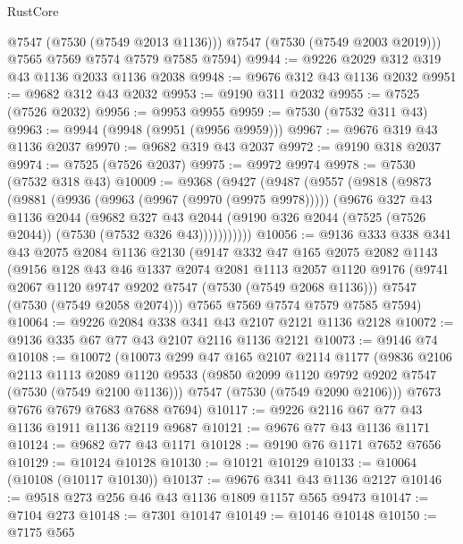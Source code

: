 \begin{lexlean}{RustCore}
\begin{coremodule}
          @7547
          (@7530 (@7549 @2013 @1136)))
        @7547
        (@7530 (@7549 @2003 @2019)))
      @7565
      @7569
      @7574
      @7579
      @7585
      @7594)
@9944 := @9226 @2029 @312 @319 @43 @1136 @2033 @1136 @2038
@9948 := @9676 @312 @43 @1136 @2032
@9951 := @9682 @312 @43 @2032
@9953 := @9190 @311 @2032
@9955 := @7525 (@7526 @2032)
@9956 := @9953 @9955
@9959 := @7530 (@7532 @311 @43)
@9963 := @9944 (@9948 (@9951 (@9956 @9959)))
@9967 := @9676 @319 @43 @1136 @2037
@9970 := @9682 @319 @43 @2037
@9972 := @9190 @318 @2037
@9974 := @7525 (@7526 @2037)
@9975 := @9972 @9974
@9978 := @7530 (@7532 @318 @43)
@10009 := @9368
    (@9427
      (@9487
        (@9557
          (@9818
            (@9873
              (@9881
                (@9936 (@9963 (@9967 (@9970 (@9975 @9978)))))
                (@9676
                  @327
                  @43
                  @1136
                  @2044
                  (@9682
                    @327
                    @43
                    @2044
                    (@9190 @326 @2044 (@7525 (@7526 @2044)) (@7530 (@7532 @326 @43)))))))))))
@10056 := @9136
    @333
    @338
    @341
    @43
    @2075
    @2084
    @1136
    @2130
    (@9147
      @332
      @47
      @165
      @2075
      @2082
      @1143
      (@9156
        @128
        @43
        @46
        @1337
        @2074
        @2081
        @1113
        @2057
        @1120
        @9176
        (@9741 @2067 @1120 @9747 @9202 @7547 (@7530 (@7549 @2068 @1136)))
        @7547
        (@7530 (@7549 @2058 @2074)))
      @7565
      @7569
      @7574
      @7579
      @7585
      @7594)
@10064 := @9226 @2084 @338 @341 @43 @2107 @2121 @1136 @2128
@10072 := @9136 @335 @67 @77 @43 @2107 @2116 @1136 @2121
@10073 := @9146 @74
@10108 := @10072
    (@10073
      @299
      @47
      @165
      @2107
      @2114
      @1177
      (@9836
        @2106
        @2113
        @1113
        @2089
        @1120
        @9533
        (@9850 @2099 @1120 @9792 @9202 @7547 (@7530 (@7549 @2100 @1136)))
        @7547
        (@7530 (@7549 @2090 @2106)))
      @7673
      @7676
      @7679
      @7683
      @7688
      @7694)
@10117 := @9226 @2116 @67 @77 @43 @1136 @1911 @1136 @2119 @9687
@10121 := @9676 @77 @43 @1136 @1171
@10124 := @9682 @77 @43 @1171
@10128 := @9190 @76 @1171 @7652 @7656
@10129 := @10124 @10128
@10130 := @10121 @10129
@10133 := @10064 (@10108 (@10117 @10130))
@10137 := @9676 @341 @43 @1136 @2127
@10146 := @9518 @273 @256 @46 @43 @1136 @1809 @1157 @565 @9473
@10147 := @7104 @273
@10148 := @7301 @10147
@10149 := @10146 @10148
@10150 := @7175 @565

\end{coremodule}
\end{lexlean}

